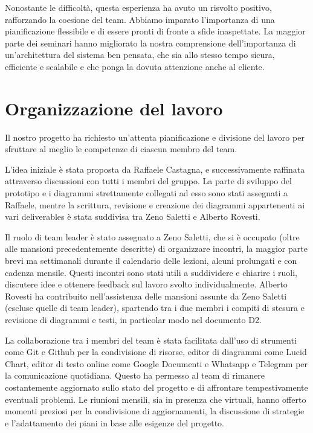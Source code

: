 \documentclass[11pt, a4paper]{article}
\theoremstyle{definition}
\begin{document}
Nonostante le difficoltà, questa esperienza ha avuto un risvolto
positivo, rafforzando la coesione del team. Abbiamo imparato
l'importanza di una pianificazione flessibile e di essere pronti
di fronte a sfide inaspettate. La maggior parte dei seminari hanno
migliorato la nostra comprensione dell'importanza di un'architettura
del sistema ben pensata, che sia allo stesso tempo sicura, efficiente
e scalabile e che ponga la dovuta attenzione anche al cliente.


\newpage
\section{Organizzazione del lavoro}
Il nostro progetto ha richiesto un'attenta pianificazione e divisione del lavoro per sfruttare al meglio le competenze di ciascun membro del team.

L’idea iniziale è stata proposta da Raffaele Castagna, e successivamente raffinata attraverso discussioni con tutti i membri del gruppo.
La parte di sviluppo del prototipo e i diagrammi strettamente collegati ad esso sono stati assegnati a Raffaele, mentre la scrittura, revisione e creazione dei diagrammi appartenenti ai vari deliverables è stata suddivisa tra Zeno Saletti e Alberto Rovesti.

Il ruolo di team leader è stato assegnato a Zeno Saletti, che si è occupato (oltre alle mansioni precedentemente descritte) di organizzare incontri, la maggior parte brevi ma settimanali durante il calendario delle lezioni, alcuni prolungati e con cadenza mensile.
Questi incontri sono stati utili a suddividere e chiarire i ruoli, discutere idee e ottenere feedback sul lavoro svolto individualmente.
Alberto Rovesti ha contribuito nell’assistenza delle mansioni assunte da Zeno Saletti (escluse quelle di team leader),
spartendo tra i due membri i compiti di stesura e revisione di diagrammi e testi, in particolar modo nel documento D2.


La collaborazione tra i membri del team è stata facilitata dall'uso di strumenti come Git e Github per la condivisione di risorse,
editor di diagrammi come Lucid Chart, editor di testo online come Google Documenti e Whatsapp e Telegram per la comunicazione quotidiana. Questo ha permesso al team di rimanere costantemente aggiornato sullo stato del progetto e di affrontare tempestivamente eventuali problemi.
Le riunioni mensili, sia in presenza che virtuali, hanno offerto momenti preziosi per la condivisione di aggiornamenti, la discussione di strategie e l'adattamento dei piani in base alle esigenze del progetto.
\end{document}
